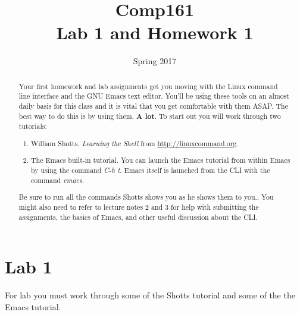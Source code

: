 \documentclass[nobib]{tufte-handout}
\title{Comp161 \\ Lab 1 and Homework 1}
\author{}
\date{ Spring 2017 }
\begin{document}
\maketitle

\begin{abstract}
Your first homework and lab assignments get you moving with the Linux command line interface and the GNU Emacs text editor.  You'll be using these tools on an almost daily basis for this class and it is vital that you get comfortable with them ASAP\@. The best way to do this is by using them.  \textbf{A lot}. To start out you will work through two tutorials:
\begin{enumerate}
\item William Shotts, \textit{Learning the Shell} from \url{http://linuxcommand.org}.
\item The Emacs built-in tutorial. You can launch the Emacs tutorial from within Emacs by using the command \textit{C-h t}.  Emacs itself is launched from the CLI with the command \textit{emacs}.
\end{enumerate}
Be sure to run all the commands Shotts shows you as he shows them to you..  You might also need to refer to lecture notes 2 and 3 for help with submitting the assignments, the basics of Emacs, and other useful discussion about the CLI\@.
\end{abstract}


\section{Lab 1}

For lab you must work through some of the  Shotts tutorial and some of the the Emacs tutorial.
\end{document}
